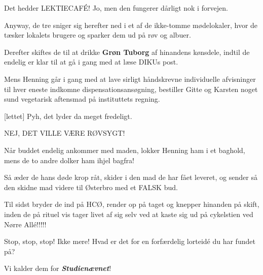 \documentclass[a4paper,11pt]{article}
\begin{document}
\begin{sketch}
 Det hedder LEKTIECAFÉ! Jo, men den fungerer dårligt nok i forvejen. 

 Anyway, de tre sniger sig herefter ned i et af de ikke-tomme mødelokaler, hvor de tæsker lokalets brugere og sparker dem ud på røv og albuer.

 Derefter skiftes de til at drikke \textbf{Grøn Tuborg} af hinandens kønsdele, indtil de endelig er klar til at gå i gang med at læse DIKUs post.

 Mens Henning går i gang med at lave sirligt håndskrevne individuelle afvisninger til hver eneste indkomne dispensationsansøgning, bestiller Gitte og Karsten noget sund vegetarisk aftensmad på instituttets regning.

[lettet] Pyh, det lyder da meget fredeligt.

 NEJ, DET VILLE VÆRE RØVSYGT!

 Når buddet endelig ankommer med maden, lokker Henning ham i et baghold, mens de to andre dolker ham ihjel bagfra!

 Så æder de hans døde krop råt, skider i den mad de har fået leveret, og sender så den skidne mad videre til Østerbro med et FALSK bud.

 Til sidst bryder de ind på HCØ, render op på taget og knepper hinanden på skift, inden de på rituel vis tager livet af sig selv ved at kaste sig ud på cykelstien ved Nørre Allé!!!!!

 Stop, stop, stop! Ikke mere! Hvad er det for en forfærdelig lorteidé du har fundet på?

 Vi kalder dem for  \textit{\textbf{Studienævnet}}!

\end{sketch}
\end{document}
